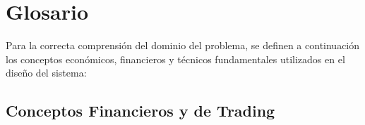 \chapter{Glosario}
\label{chap:glosario}

Para la correcta comprensión del dominio del problema, se definen a continuación los conceptos económicos, financieros y técnicos fundamentales utilizados en el diseño del sistema:


\section*{Conceptos Financieros y de Trading}

